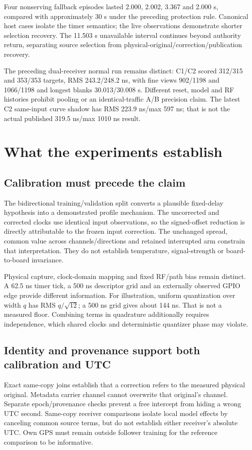 \documentclass[11pt,letterpaper]{article}
\newcommand{\page}{\clearpage}
\begin{document}
Four nonserving fallback episodes lasted 2.000, 2.002, 3.367 and 2.000 s, compared with approximately 30 s under the preceding protection rule. Canonical host cases isolate the timer semantics; the live observations demonstrate shorter selection recovery. The 11.503 s unavailable interval continues beyond authority return, separating source selection from physical-original/correction/publication recovery.

The preceding dual-receiver normal run remains distinct: C1/C2 scored 312/315 and 353/353 targets, RMS 243.2/248.2 ns, with fine views 902/1198 and 1066/1198 and longest blanks 30.013/30.008 s. Different reset, model and RF histories prohibit pooling or an identical-traffic A/B precision claim. The latest C2 same-input curve shadow has RMS 223.9 ns/max 597 ns; that is not the actual published 319.5 ns/max 1010 ns result.
\page
\section{What the experiments establish}
\subsection{Calibration must precede the claim}
The bidirectional training/validation split converts a plausible fixed-delay hypothesis into a demonstrated profile mechanism. The uncorrected and corrected clocks use identical input observations, so the signed-offset reduction is directly attributable to the frozen input correction. The unchanged spread, common value across channels/directions and retained interrupted arm constrain that interpretation. They do not establish temperature, signal-strength or board-to-board invariance.

Physical capture, clock-domain mapping and fixed RF/path bias remain distinct. A 62.5 ns timer tick, a 500 ns descriptor grid and an externally observed GPIO edge provide different information. For illustration, uniform quantization over width $q$ has RMS $q/\sqrt{12}$; a 500 ns grid gives about 144 ns. That is not a measured floor. Combining terms in quadrature additionally requires independence, which shared clocks and deterministic quantizer phase may violate.

\subsection{Identity and provenance support both calibration and UTC}
Exact same-copy joins establish that a correction refers to the measured physical original. Metadata carrier channel cannot overwrite that original's channel. Separate epoch/provenance checks prevent a free intercept from hiding a wrong UTC second. Same-copy receiver comparisons isolate local model effects by canceling common source terms, but do not establish either receiver's absolute UTC. Own GPS must remain outside follower training for the reference comparison to be informative.
\end{document}

